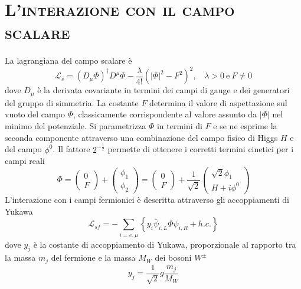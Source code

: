 \documentclass[11pt]{article}
\begin{document}
    \section{\centering\textsc{L'interazione con il campo scalare} } 
    La lagrangiana del campo scalare è
    \begin{equation}
    \mathcal{L}_s=\left(D_\mu\Phi\right)^\dagger D^\mu\Phi-\frac{\lambda}{4!}\left(\lvert\Phi\rvert^2-F^2\right)^2, \ \ \ \ \lambda>0\ \mathrm{e} \ F\neq0
    \end{equation}
    dove $D_\mu$ è la derivata covariante in termini dei campi di gauge e dei generatori del gruppo di simmetria. La costante $F$ determina il valore di aspettazione sul vuoto del campo $\Phi$, classicamente corrispondente
    al valore assunto da $\lvert\Phi\rvert$ nel minimo del potenziale. Si parametrizza $\Phi$ in termini di $F$ e se ne esprime la seconda componente attraverso una combinazione del campo fisico di Higgs $H$ e del campo $\phi^0$.
    Il fattore $2^{-\frac{1}{2}}$ permette di ottenere i corretti termini cinetici per i campi reali
    \begin{equation}\label{PhiParameterization}
    \Phi=\begin{pmatrix}0 \\F\end{pmatrix}+\begin{pmatrix}\phi_1 \\\phi_2\end{pmatrix}=\begin{pmatrix}0\\F\end{pmatrix}+\frac{1}{\sqrt{2}}\begin{pmatrix}\sqrt{2}\phi_1 \\H+i\phi^0\end{pmatrix}
    \end{equation}
    L'interazione con i campi fermionici è descritta attraverso gli accoppiamenti di Yukawa
    \begin{equation}\label{YukawaCouplings}
    \mathcal{L}_{sf}=-\sum_{i=e,\mu}\left\{y_i\bar{\psi}_{i,L}\Phi\psi_{i,R}+h.c.\right\}
    \end{equation}
    dove $y_j$ è la costante di accoppiamento di Yukawa, proporzionale al rapporto tra la massa $m_j$ del fermione e la massa $M_W$ dei bosoni $W^\pm$
    \begin{equation}\label{YukawaConstant}
    y_j=\frac{1}{\sqrt{2}}g\frac{m_j}{M_W}
    \end{equation}
\end{document}

